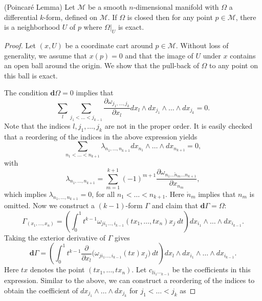\begin{theorem} \label{theorem:2.4}
(Poincar\'e Lemma) Let $\mathcal M$ be a smooth $n$-dimensional manifold with $\Omega$ a differential $k$-form, defined on $\mathcal M$. If $\Omega$ is closed then for any point $p\in \mathcal M$, there is a neighborhood $U$ of $p$ where $\Omega|_{U}$ is exact.
\end{theorem}

\begin{proof}
Let $(x,U)$ be a coordinate cart around $p\in \mathcal M$. Without loss of generality, we assume that $x(p)=0$ and that the image of $U$ under $x$ contains an open ball around the origin. We show that the pull-back of $\Omega$ to any point on this ball is exact.

The condition $\mathbf d \Omega = 0$ implies that
\begin{equation*}
	\sum_l \sum_{j_1<\dots<j_{k-1}} \frac{\partial \omega_{j_1,\dots,j_k}}{\partial x_l} dx_l\wedge dx_{j_1}\wedge \dots \wedge dx_{j_k} = 0.
\end{equation*}
Note that the indices $l,j_1,\dots,j_k$ are not in the proper order. It is easily checked that a reordering of the indices in the above expression yields
\begin{equation*}
	\sum_{n_1<\dots<n_{k+1}}\lambda_{n_1,\dots,n_{k+1}} dx_{n_1}\wedge \dots \wedge dx_{n_{k+1}} = 0,
\end{equation*}
with
\begin{equation*}
	\lambda_{n_1,\dots,n_{k+1}} = \sum_{m=1}^{k+1} (-1)^{m+1} \frac{\partial \omega_{n_1\dots\mathring n_m \dots n_{k+1}}}{\partial x_{n_m}},
\end{equation*}
which implies $\lambda_{n_1,\dots,n_{k+1}} = 0$, for all $n_1<\dots<n_{k+1}$. Here $\mathring n_m$ implies that $n_m$ is omitted. Now we construct a $(k-1)$-form $\Gamma$ and claim that $\mathbf d \Gamma = \Omega$:
\begin{equation*}
	\Gamma_{(x_1,\dots,x_n)} = \left( \int_0^1 t^{k-1} \omega_{ji_1\dots,i_{k-1}}(tx_1,\dots,tx_n) x_j \ dt \right) dx_{i_1}\wedge \dots \wedge dx_{i_{k-1}}.
\end{equation*}
Taking the exterior derivative of $\Gamma$ gives
\begin{equation*}
	\mathbf d \Gamma = \left( \int_0^1 t^{k-1} \frac{\partial }{\partial x_l} \big( \omega_{ji_1\dots,i_{k-1}}(tx) x_j \big) \ dt \right) dx_l\wedge dx_{i_1}\wedge \dots \wedge dx_{i_{k-1}}.
\end{equation*}
Here $tx$ denotes the point $(tx_1,\dots,tx_n)$. Let $c_{li_1\dotsi_{k-1}}$ be the coefficients in this expression. Similar to the above, we can construct a reordering of the indices to obtain the coefficient of $dx_{j_1}\wedge\dots\wedge dx_{j_k}$ for $j_1<\dots<j_{k}$ as

\end{proof}
